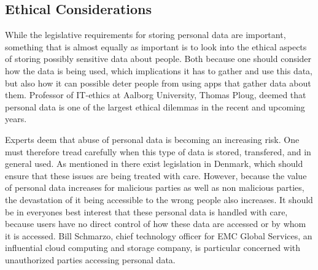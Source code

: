 
\subsection{Ethical Considerations}
\label{sub:ethical_considerations}

While the legislative requirements for storing personal data are important, something that is almost equally as important is to look into the ethical aspects of storing possibly sensitive data about people. Both because one should consider how the data is being used, which implications it has to gather and use this data, but also how it can possible deter people from using apps that gather data about them. Professor of IT-ethics at Aalborg University, Thomas Ploug, deemed that personal data is one of the largest ethical dilemmas in the recent and upcoming years.


Experts deem that abuse of personal data is becoming an increasing risk. One must therefore tread carefully when this type of data is stored, transfered, and in general used. As mentioned in  there exist legislation in Denmark, which should ensure that these issues are being treated with care. However, because the value of personal data increases for malicious parties as well as non malicious parties, the devastation of it being accessible to the wrong people also increases. It should be in everyones best interest that these personal data is handled with care, because users have no direct control of how these data are accessed or by whom it is accessed. Bill Schmarzo, chief technology officer for EMC Global Services, an influential cloud computing and storage company, is particular concerned with unauthorized parties accessing personal data.


